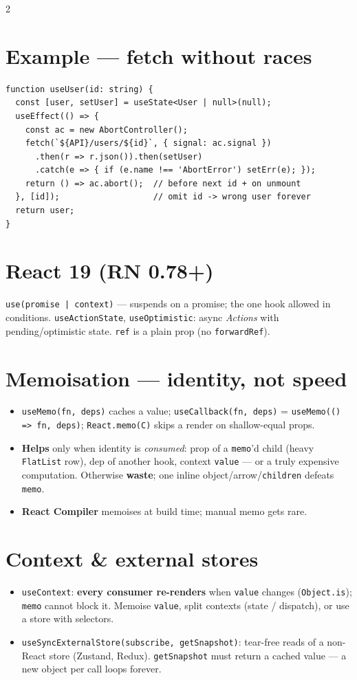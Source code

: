 \documentclass[8pt]{extarticle}
\begin{document}
\begin{multicols}{2}
\section{Example — fetch without races}
\begin{lstlisting}[language=TSSheet]
function useUser(id: string) {
  const [user, setUser] = useState<User | null>(null);
  useEffect(() => {
    const ac = new AbortController();
    fetch(`${API}/users/${id}`, { signal: ac.signal })
      .then(r => r.json()).then(setUser)
      .catch(e => { if (e.name !== 'AbortError') setErr(e); });
    return () => ac.abort();  // before next id + on unmount
  }, [id]);                   // omit id -> wrong user forever
  return user;
}
\end{lstlisting}

\section{React 19 (RN 0.78+)}
\texttt{use(promise | context)} — suspends on a promise; the one hook allowed in
conditions. \texttt{useActionState}, \texttt{useOptimistic}: async \emph{Actions} with
pending/optimistic state. \texttt{ref} is a plain prop (no \texttt{forwardRef}).

\columnbreak

\section{Memoisation — identity, not speed}
\begin{itemize}
  \item \texttt{useMemo(fn, deps)} caches a value; \texttt{useCallback(fn, deps)} =
        \texttt{useMemo(() => fn, deps)}; \texttt{React.memo(C)} skips a render on
        shallow-equal props.
  \item \textbf{Helps} only when identity is \emph{consumed}: prop of a \texttt{memo}'d child
        (heavy \texttt{FlatList} row), dep of another hook, context \texttt{value} — or a
        truly expensive computation. Otherwise \textbf{waste}; one inline
        object/arrow/\texttt{children} defeats \texttt{memo}.
  \item \textbf{React Compiler} memoises at build time; manual memo gets rare.
\end{itemize}

\section{Context \& external stores}
\begin{itemize}
  \item \texttt{useContext}: \textbf{every consumer re-renders} when \texttt{value} changes
        (\texttt{Object.is}); \texttt{memo} cannot block it. Memoise \texttt{value}, split
        contexts (state / dispatch), or use a store with selectors.
  \item \texttt{useSyncExternalStore(subscribe, getSnapshot)}: tear-free reads of a
        non-React store (Zustand, Redux). \texttt{getSnapshot} must return a cached value
        — a new object per call loops forever.
\end{itemize}


\end{multicols}
\end{document}
